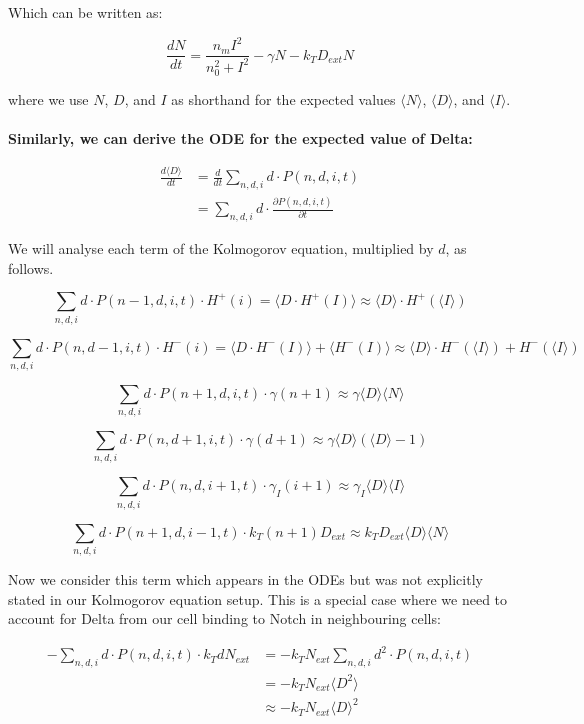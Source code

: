 \documentclass{article}
\begin{document}
\begin{flushleft}
Which can be written as:

\[
\frac{dN}{dt} = \frac{n_m I^2}{n_0^2 + I^2} - \gamma N - k_T D_{ext} N
\]

where we use $N$, $D$, and $I$ as shorthand for the expected values $\langle N \rangle$, $\langle D \rangle$, and $\langle I \rangle$.\\~\\

\textbf{Similarly, we can derive the ODE for the expected value of Delta:}

\begin{align*}
\frac{d\langle D \rangle}{dt} &= \frac{d}{dt}\sum_{n,d,i} d \cdot P(n,d,i,t) \\
&= \sum_{n,d,i} d \cdot \frac{\partial P(n,d,i,t)}{\partial t}
\end{align*}

We will analyse each term of the Kolmogorov equation, multiplied by $d$, as follows.

\[
\sum_{n,d,i} d \cdot P(n-1,d,i,t) \cdot H^+(i) = \langle D \cdot H^+(I) \rangle \approx \langle D \rangle \cdot H^+(\langle I \rangle)
\]

\[
\sum_{n,d,i} d \cdot P(n,d-1,i,t) \cdot H^-(i) = \langle D \cdot H^-(I) \rangle + \langle H^-(I) \rangle 
\approx \langle D \rangle \cdot H^-(\langle I \rangle) + H^-(\langle I \rangle)
\]

\[
\sum_{n,d,i} d \cdot P(n+1,d,i,t) \cdot \gamma(n+1) \approx \gamma \langle D \rangle \langle N \rangle
\]

\[
\sum_{n,d,i} d \cdot P(n,d+1,i,t) \cdot \gamma(d+1) \approx \gamma \langle D \rangle (\langle D \rangle - 1)
\]

\[
\sum_{n,d,i} d \cdot P(n,d,i+1,t) \cdot \gamma_I(i+1) \approx \gamma_I \langle D \rangle \langle I \rangle
\]

\[
\sum_{n,d,i} d \cdot P(n+1,d,i-1,t) \cdot k_T(n+1)D_{ext} \approx k_T D_{ext} \langle D \rangle \langle N \rangle
\]

Now we consider this term which appears in the ODEs but was not explicitly stated in our Kolmogorov equation setup. This is a special case where we need to account for Delta from our cell binding to Notch in neighbouring cells:

\begin{align*}
-\sum_{n,d,i} d \cdot P(n,d,i,t) \cdot k_T d N_{ext} &= -k_T N_{ext} \sum_{n,d,i} d^2 \cdot P(n,d,i,t) \\
&= -k_T N_{ext} \langle D^2 \rangle \\
&\approx -k_T N_{ext} \langle D \rangle^2
\end{align*}


\end{flushleft}
\end{document}
